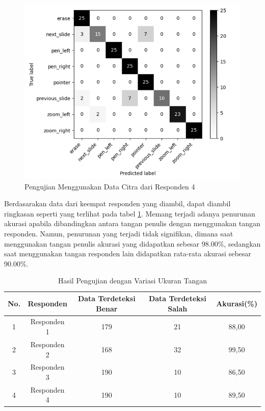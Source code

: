 \begin{figure}[ht]
  \centering
  \includegraphics[scale=0.5]{gambar/pengujian-ukuran-tangan/tangan-bakar.png}
  \caption{Pengujian Menggunakan Data Citra dari Responden 4}
  \label{fig:Pengujian Menggunakan Data Citra dari Responden 4}
\end{figure}

Berdasarakan data dari keempat responden yang diambil, dapat diambil ringkasan seperti yang terlihat pada tabel \ref{tb:Hasil Pengujian dengan Variasi Ukuran Tangan}. Memang terjadi adanya penurunan akurasi apabila dibandingkan antara tangan penulis dengan menggunakan tangan responden. Namun, penurunan yang terjadi tidak signifikan, dimana saat menggunakan tangan penulis akurasi yang didapatkan sebesar 98.00\%, sedangkan saat menggunakan tangan responden lain didapatkan rata-rata akurasi sebesar 90.00\%. 

\begin{longtable}{|c|c|c|c|c|}
  \caption{Hasil Pengujian dengan Variasi Ukuran Tangan}
  \label{tb:Hasil Pengujian dengan Variasi Ukuran Tangan}\\
  \hline
  \rowcolor[HTML]{FFFFFF}
  \textbf{No.} & \textbf{Responden} & \textbf{Data Terdeteksi Benar} & \textbf{Data Terdeteksi Salah} & \textbf{Akurasi(\%)} \\
  \hline
  1 & Responden 1  & 179 & 21 & 88,00  \\
  2 & Responden 2  & 168 & 32 & 99,50  \\
  3 & Responden 3  & 190 & 10 & 86,50  \\
  4 & Responden 4  & 190 & 10 & 89,50  \\
  \hline
\end{longtable}


